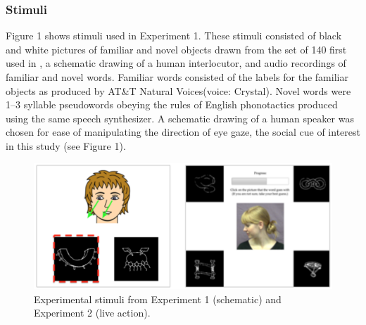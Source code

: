 \documentclass[10pt,letterpaper]{article}
\begin{document}
\subsubsection{Stimuli}
Figure 1 shows stimuli used in Experiment 1. These stimuli consisted of black and white pictures of familiar and novel objects drawn from the set of 140 first used in , a schematic drawing of a human interlocutor, and audio recordings of familiar and novel words. 
Familiar words consisted of the labels for the familiar objects as produced by AT\&T Natural Voices\texttrademark (voice: Crystal). Novel words were 1--3 syllable pseudowords obeying the rules of English phonotactics produced using the same speech synthesizer. 
A schematic drawing of a human speaker was chosen for ease of manipulating the direction of eye gaze, the social cue of interest in this study (see Figure 1). 

\begin{figure} [t!]
\begin{center}
\includegraphics[scale=0.4]{plots_figs/soc-xsit-stimuli.png}
\end{center}
\caption{Experimental stimuli from Experiment 1 (schematic) and Experiment 2 (live action).}
\end{figure}
\end{document}
